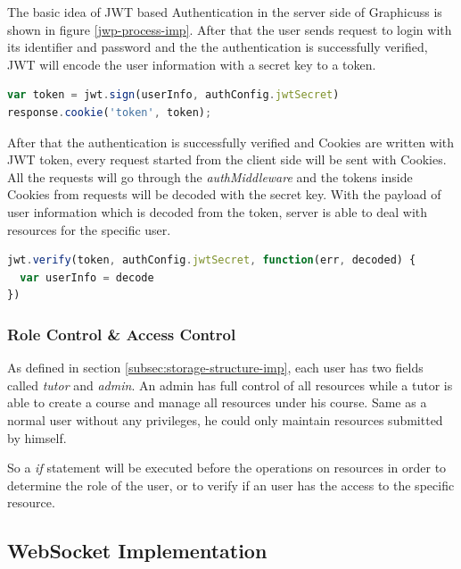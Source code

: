 The basic idea of JWT based Authentication in the server side of Graphicuss is shown in figure \ref{jwp-process-imp}. After that the user sends request to login with its identifier and password and the the authentication is successfully verified, JWT will encode the user information with a secret key to a token.

\begin{lstlisting}[language=JavaScript, caption=JWT encodes user information with secret key, label={list:jwt-encode-imp}]
var token = jwt.sign(userInfo, authConfig.jwtSecret)
response.cookie('token', token);
\end{lstlisting}

After that the authentication is successfully verified and Cookies are written with JWT token, every request started from the client side will be sent with Cookies. All the requests will go through the \textit{authMiddleware} and the tokens inside Cookies from requests will be decoded with the secret key. With the payload of user information which is decoded from the token, server is able to deal with resources for the specific user.

\begin{lstlisting}[language=JavaScript, caption=JWT decodes user information with secret key, label={list:jwt-decode-imp}]
jwt.verify(token, authConfig.jwtSecret, function(err, decoded) {
  var userInfo = decode
})
\end{lstlisting}

\subsubsection{Role Control \& Access Control}
As defined in section \ref{subsec:storage-structure-imp}, each user has two fields called \textit{tutor} and \textit{admin}. An admin has full control of all resources while a tutor  is able to create a course and manage all resources under his course. Same as a normal user without any privileges, he could only maintain resources submitted by himself.

So a \textit{if} statement will be executed before the operations on resources in order to determine the role of the user, or to verify if an user has the access to the specific resource.




\subsection{WebSocket Implementation}
